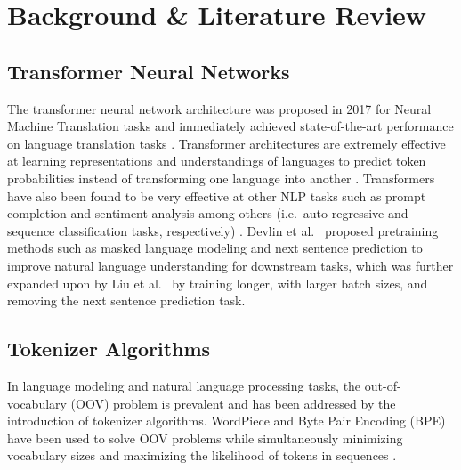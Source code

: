 \documentclass[12pt]{article}
\begin{document}
\section{Background \& Literature Review}\label{sec:lit_review}

\subsection{Transformer Neural Networks}
The transformer neural network architecture was proposed in 2017 for Neural Machine Translation tasks and immediately achieved state-of-the-art
performance on language translation tasks \cite{vaswani_attention_2017}. Transformer architectures are extremely effective at learning representations
and understandings of languages to predict token probabilities instead of transforming one language into another
\cite{devlin_bert_2019,liu_roberta_2019}. Transformers have also been found to be very effective at other NLP tasks such as prompt completion
and sentiment analysis among others (i.e.~auto-regressive and sequence classification tasks, respectively)
\cite{lewis_bart_2019,radford_improving_2018}. Devlin et al.~\cite{devlin_bert_2019} proposed pretraining methods such as masked language modeling
and next sentence prediction to improve natural language understanding for downstream tasks, which was further expanded upon by Liu et
al.~\cite{liu_roberta_2019} by training longer, with larger batch sizes, and removing the next sentence prediction task.

\subsection{Tokenizer Algorithms}
In language modeling and natural language processing tasks, the out-of-vocabulary (OOV) problem is prevalent and has been addressed by the
introduction of tokenizer algorithms. WordPiece and Byte Pair Encoding (BPE) have been used to solve OOV problems while simultaneously minimizing
vocabulary sizes and maximizing the likelihood of tokens in sequences \cite{wu_googles_2016,schuster_japanese_2012,sennrich_neural_2016}.
\end{document}
